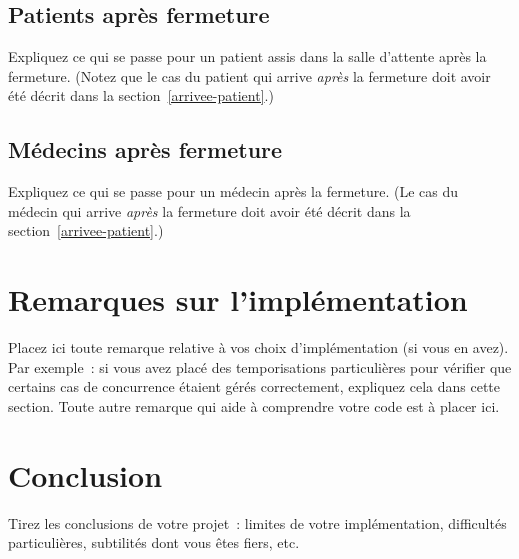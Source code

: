 \documentclass[a4paper]{article}
\makeatletter
\newenvironment{expl}{%
  \begin{list}{}{%
      \small\itshape%
      \topsep\z@%
      \listparindent0pt%
      \parsep0.75\baselineskip%
      \setlength{\leftmargin}{20mm}%
      \setlength{\rightmargin}{20mm}%
    }
  \item[]}%
  {\end{list}}
\makeatother
\begin{document}
\subsection{Patients après fermeture}

\begin{expl}
  Expliquez ce qui se passe pour un patient assis dans la salle
  d'attente après la fermeture. (Notez que le cas du patient qui
  arrive \emph{après} la fermeture doit avoir été décrit dans la
  section~\ref{arrivee-patient}.)
\end{expl}

\subsection{Médecins après fermeture}

\begin{expl}
  Expliquez ce qui se passe pour un médecin après la fermeture. (Le
  cas du médecin qui arrive \emph{après} la fermeture doit avoir été
  décrit dans la section~\ref{arrivee-patient}.)
\end{expl}

\section{Remarques sur l'implémentation}

\begin{expl}
  Placez ici toute remarque relative à vos choix d'implémentation (si
  vous en avez). Par exemple~: si vous avez placé des temporisations
  particulières pour vérifier que certains cas de concurrence étaient
  gérés correctement, expliquez cela dans cette section. Toute autre
  remarque qui aide à comprendre votre code est à placer ici.
\end{expl}

\section{Conclusion}

\begin{expl}
  Tirez les conclusions de votre projet~: limites de votre
  implémentation, difficultés particulières, subtilités dont vous êtes
  fiers, etc.
\end{expl}
\end{document}
